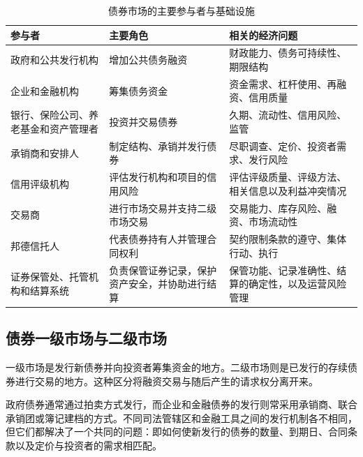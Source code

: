 \begin{table}[H]
\centering
\caption{债券市场的主要参与者与基础设施}
\label{tab:ch8-market-participants}

\begin{tabularx}{\textwidth}{@{}p{3.1cm}Y Y@{}}
\toprule
\textbf{参与者} &
\textbf{主要角色} &
\textbf{相关的经济问题} \\
\midrule

政府和公共发行机构  
& 增加公共债务融资  
& 财政能力、债务可持续性、期限结构  
\\

企业和金融机构  
& 筹集债务资金  
& 资金需求、杠杆使用、再融资、信用质量 \\

银行、保险公司、养老基金和资产管理者&投资并交易债券&久期、流动性、信用风险、监管\\

承销商和安排人
& 制定结构、承销并发行债券
& 尽职调查、定价、投资者需求、发行风险 \\

信用评级机构  
& 评估发行机构和项目的信用风险  
& 评估评级质量、评级方法、相关信息以及利益冲突情况  
\\

交易商
& 进行市场交易并支持二级市场交易
& 交易能力、库存风险、融资、市场流动性\\

邦德信托人&代表债券持有人并管理合同权利&契约限制条款的遵守、集体行动、执行\\

证券保管处、托管机构和结算系统
& 负责保管证券记录，保护资产安全，并协助进行结算
& 保管功能、记录准确性、结算的确定性，以及运营风险管理 \\

\bottomrule
\end{tabularx}
\end{table}

\subsection{债券一级市场与二级市场}

一级市场是发行新债券并向投资者筹集资金的地方。二级市场则是已发行的存续债券进行交易的地方。这种区分将融资交易与随后产生的请求权分离开来。

政府债券通常通过拍卖方式发行，而企业和金融债券的发行则常采用承销商、联合承销团或簿记建档的方式。不同司法管辖区和金融工具之间的发行机制各不相同，但它们都解决了一个共同的问题：即如何使新发行的债券的数量、到期日、合同条款以及定价与投资者的需求相匹配。


